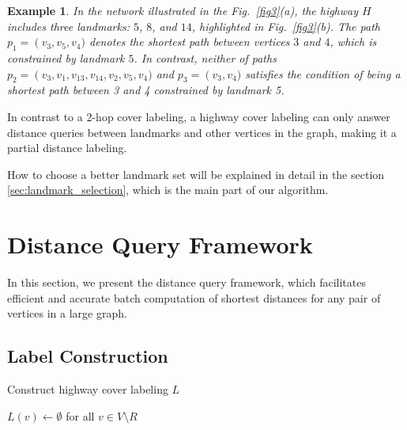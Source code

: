 \documentclass[sigconf]{acmart}
\newtheorem{example}{Example}
\begin{document}
%
%
\begin{example}
    In the network illustrated in the Fig.~\ref{fig3}(a), the highway $H$ includes three landmarks: $5$, $8$, and $14$, highlighted in Fig.~\ref{fig3}(b). The path $p_{1}=\left(v_{3}, v_{5}, v_{4})\right.$ denotes the shortest path between vertices $3$ and $4$, which is constrained by landmark $5$. In contrast, neither of paths $p_{2}=\left(v_{3}, v_{1}, v_{13}, v_{14}, v_{2}, v_{5}, v_{4})\right.$ and $p_{3}=\left(v_{3}, v_{4})\right.$ satisfies the condition of being a shortest path between 3 and 4 constrained by landmark 5.\par
\end{example}

In contrast to a 2-hop cover labeling, a highway cover labeling can only answer distance queries between landmarks and other vertices in the graph, making it a partial distance labeling\cite{ref12}.\par

How to choose a better landmark set will be explained in detail in the section \ref{sec:landmark_selection}, which is the main part of our algorithm.
%
%
\section{Distance Query Framework}
\label{sec:Framework}
In this section, we present the distance query framework, which facilitates efficient and accurate batch computation of shortest distances for any pair of vertices in a large graph.

\subsection{Label Construction}
%
%
%
\begin{algorithm}
\caption{Construct highway cover labeling $L$}
$L(v) \gets \emptyset$ for all $v \in V \setminus R$\;
\end{algorithm}
\end{document}
